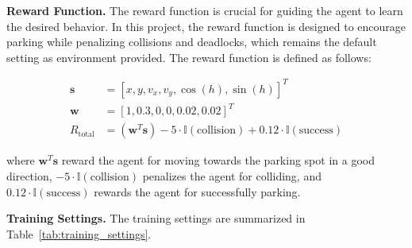 \documentclass{article}
\begin{document}
\textbf{Reward Function.} The reward function is crucial for guiding the agent to learn the desired behavior. In this project, the reward function is designed to encourage parking while penalizing collisions and deadlocks, which remains the default setting as environment provided. The reward function is defined as follows:

\begin{align*}
  \mathbf{s}       & = [x, y, v_x, v_y, \cos(h), \sin(h)]^T                                                                     \\
  \mathbf{w}       & = [1, 0.3, 0, 0, 0.02, 0.02]^T                                                                             \\
  R_{\text{total}} & = (\mathbf{w}^T \mathbf{s}) - 5 \cdot \mathbb{I}(\text{collision}) + 0.12 \cdot \mathbb{I}(\text{success})
\end{align*}

where $\mathbf{w}^T \mathbf{s}$ reward the agent for moving towards the parking spot in a good direction, $- 5 \cdot \mathbb{I}(\text{collision})$ penalizes the agent for colliding, and $0.12 \cdot \mathbb{I}(\text{success})$ rewards the agent for successfully parking.

\textbf{Training Settings.} The training settings are summarized in Table~\ref{tab:training_settings}.
\end{document}
